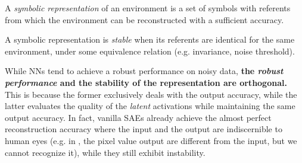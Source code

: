 \begin{defi}
A \emph{symbolic representation} of an environment is a set of symbols with referents
from which the environment can be reconstructed with a sufficient accuracy.
\end{defi}

\begin{defi}
A symbolic representation is \emph{stable} when its referents are identical
for the same environment, under some equivalence relation (e.g. invariance, noise threshold).
\end{defi}



While NNs tend to achieve a robust performance on noisy data,
\textbf{the \emph{robust performance} and the stability of the representation are orthogonal.}
This is because the former exclusively deals with the output accuracy,
while the latter evaluates the quality of the \emph{latent} activations while maintaining the same output accuracy.
In fact, vanilla SAEs already achieve the almost perfect reconstruction accuracy
where the input and the output are indiscernible to human eyes
(e.g. in , the pixel value output are different from the input, but we cannot recognize it),
while they still exhibit instability.


